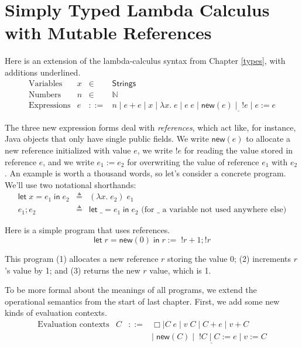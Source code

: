 \documentclass{amsbook}
\theoremstyle{definition}
\theoremstyle{remark}
\numberwithin{section}{chapter}
\numberwithin{equation}{chapter}
\begin{document}
\section{Simply Typed Lambda Calculus with Mutable References}

\newcommand{\newref}[1]{\mathsf{new}(#1)}
\newcommand{\readref}[1]{!#1}
\newcommand{\writeref}[2]{#1 := #2}

Here is an extension of the lambda-calculus syntax from Chapter \ref{types}, with additions underlined.
$$\begin{array}{rrcl}
  \textrm{Variables} & x &\in& \mathsf{Strings} \\
  \textrm{Numbers} & n &\in& \mathbb N \\
  \textrm{Expressions} & e &::=& n \mid e + e \mid x \mid \lambda x. \; e \mid e \; e \mid \underline{\newref{e} \mid \; \readref{e} \mid \writeref{e}{e}}
\end{array}$$

\newcommand{\elet}[3]{\mathsf{let} \; #1 = #2 \; \mathsf{in} \; #3}

The three new expression forms deal with \emph{references}, which act like, for instance, Java objects that only have single public fields.
We write $\newref{e}$ to allocate a new reference initialized with value $e$, we write $\readref{e}$ for reading the value stored in reference $e$, and we write $\writeref{e_1}{e_2}$ for overwriting the value of reference $e_1$ with $e_2$.
An example is worth a thousand words, so let's consider a concrete program.
We'll use two notational shorthands:
\begin{eqnarray*}
  \elet{x}{e_1}{e_2} &\triangleq& (\lambda x. \; e_2) \; e_1 \\
  e_1; e_2 &\triangleq& \elet{\_}{e_1}{e_2} \textrm{ (for $\_$ a variable not used anywhere else)}
\end{eqnarray*}

Here is a simple program that uses references.
$$\elet{r}{\newref{0}}{\writeref{r}{\; \readref{r} + 1}; \readref{r}}$$

This program (1) allocates a new reference $r$ storing the value 0; (2) increments $r$'s value by 1; and (3) returns the new $r$ value, which is 1.

To be more formal about the meanings of all programs, we extend the operational semantics from the start of last chapter.
First, we add some new kinds of evaluation contexts.
$$\begin{array}{rrcl}
  \textrm{Evaluation contexts} & C &::=& \Box \mid C \; e \mid v \; C \mid C + e \mid v + C \\
  &&& \mid \; \underline{\newref{C} \mid \; \readref{C} \mid \writeref{C}{e} \mid \writeref{v}{C}}
\end{array}$$
\end{document}
